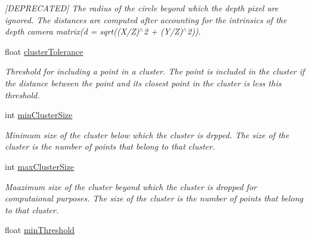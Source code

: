 \begin{DoxyCompactItemize}
\begin{DoxyCompactList}\small\item\em \mbox{[}D\+E\+P\+R\+E\+C\+A\+T\+E\+D\mbox{]} The radius of the circle beyond which the depth pixel are ignored. The distances are computed after accounting for the intrinsics of the depth camera matrix(d = sqrt((X/\+Z)$^\wedge$2 + (Y/\+Z)$^\wedge$2)). \end{DoxyCompactList}\item 
\hypertarget{classpersonal_robotics_1_1_object_segmentor_aff532da1615f30842194f6da1c083423}{}float \hyperlink{classpersonal_robotics_1_1_object_segmentor_aff532da1615f30842194f6da1c083423}{cluster\+Tolerance}\label{classpersonal_robotics_1_1_object_segmentor_aff532da1615f30842194f6da1c083423}

\begin{DoxyCompactList}\small\item\em Threshold for including a point in a cluster. The point is included in the cluster if the distance between the point and its closest point in the cluster is less this threshold. \end{DoxyCompactList}\item 
\hypertarget{classpersonal_robotics_1_1_object_segmentor_aea041b14924056573ba1f3a6f583f9a9}{}int \hyperlink{classpersonal_robotics_1_1_object_segmentor_aea041b14924056573ba1f3a6f583f9a9}{min\+Cluster\+Size}\label{classpersonal_robotics_1_1_object_segmentor_aea041b14924056573ba1f3a6f583f9a9}

\begin{DoxyCompactList}\small\item\em Minimum size of the cluster below which the cluster is drpped. The size of the cluster is the number of points that belong to that cluster. \end{DoxyCompactList}\item 
\hypertarget{classpersonal_robotics_1_1_object_segmentor_a1399221b16239bf902cf1c07536743d3}{}int \hyperlink{classpersonal_robotics_1_1_object_segmentor_a1399221b16239bf902cf1c07536743d3}{max\+Cluster\+Size}\label{classpersonal_robotics_1_1_object_segmentor_a1399221b16239bf902cf1c07536743d3}

\begin{DoxyCompactList}\small\item\em Maazimum size of the cluster beyond which the cluster is dropped for computaional purposes. The size of the cluster is the number of points that belong to that cluster. \end{DoxyCompactList}\item 
\hypertarget{classpersonal_robotics_1_1_object_segmentor_acf97d17ad413314b2fb2c37e23965897}{}float \hyperlink{classpersonal_robotics_1_1_object_segmentor_acf97d17ad413314b2fb2c37e23965897}{min\+Threshold}\label{classpersonal_robotics_1_1_object_segmentor_acf97d17ad413314b2fb2c37e23965897}


\end{DoxyCompactItemize}
